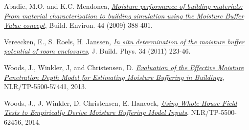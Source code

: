 Abadie, M.O. and K.C. Mendonca,
\href{http://www.sciencedirect.com/science/article/pii/S0360132308000528}{\emph{Moisture
		performance of building materials: From material characterization to
		building simulation using the Moisture Buffer Value concept}}, Build.
Environ. 44 (2009) 388-401.

Vereecken, E., S. Roels, H. Janssen,
\href{http://jen.sagepub.com/content/34/3/223.abstract}{\emph{In situ
		determination of the moisture buffer potential of room enclosures}}, J.
Build. Phys. 34 (2011) 223-46.

Woods, J., Winkler, J, and Christensen, D.
\href{http://www.nlr.gov/docs/fy13osti/57441.pdf}{\emph{Evaluation of
		the Effective Moisture Penetration Depth Model for Estimating Moisture
		Buffering in Buildings}}, NLR/TP-5500-57441, 2013.

Woods, J., J. Winkler, D. Christensen, E. Hancock,
\href{http://www.nlr.gov/docs/fy14osti/62456.pdf}{\emph{Using
		Whole-House Field Tests to Empirically Derive Moisture Buffering Model
		Inputs}}. NLR/TP-5500-62456, 2014.
